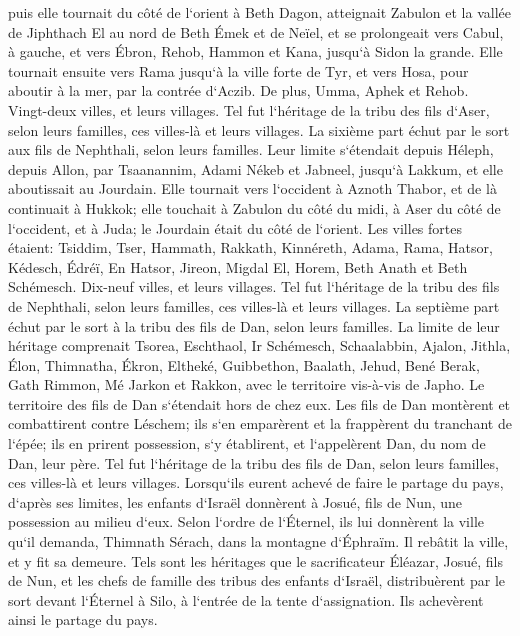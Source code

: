 \verse puis elle tournait du côté de l`orient à Beth Dagon, atteignait Zabulon et la vallée de Jiphthach El au nord de Beth Émek et de Neïel, et se prolongeait vers Cabul, à gauche, 
\verse et vers Ébron, Rehob, Hammon et Kana, jusqu`à Sidon la grande. 
\verse Elle tournait ensuite vers Rama jusqu`à la ville forte de Tyr, et vers Hosa, pour aboutir à la mer, par la contrée d`Aczib. 
\verse De plus, Umma, Aphek et Rehob. Vingt-deux villes, et leurs villages. 
\verse Tel fut l`héritage de la tribu des fils d`Aser, selon leurs familles, ces villes-là et leurs villages. 
\verse La sixième part échut par le sort aux fils de Nephthali, selon leurs familles. 
\verse Leur limite s`étendait depuis Héleph, depuis Allon, par Tsaanannim, Adami Nékeb et Jabneel, jusqu`à Lakkum, et elle aboutissait au Jourdain. 
\verse Elle tournait vers l`occident à Aznoth Thabor, et de là continuait à Hukkok; elle touchait à Zabulon du côté du midi, à Aser du côté de l`occident, et à Juda; le Jourdain était du côté de l`orient. 
\verse Les villes fortes étaient: Tsiddim, Tser, Hammath, Rakkath, Kinnéreth, 
\verse Adama, Rama, Hatsor, 
\verse Kédesch, Édréï, En Hatsor, 
\verse Jireon, Migdal El, Horem, Beth Anath et Beth Schémesch. Dix-neuf villes, et leurs villages. 
\verse Tel fut l`héritage de la tribu des fils de Nephthali, selon leurs familles, ces villes-là et leurs villages. 
\verse La septième part échut par le sort à la tribu des fils de Dan, selon leurs familles. 
\verse La limite de leur héritage comprenait Tsorea, Eschthaol, Ir Schémesch, 
\verse Schaalabbin, Ajalon, Jithla, 
\verse Élon, Thimnatha, Ékron, 
\verse Eltheké, Guibbethon, Baalath, 
\verse Jehud, Bené Berak, Gath Rimmon, 
\verse Mé Jarkon et Rakkon, avec le territoire vis-à-vis de Japho. 
\verse Le territoire des fils de Dan s`étendait hors de chez eux. Les fils de Dan montèrent et combattirent contre Léschem; ils s`en emparèrent et la frappèrent du tranchant de l`épée; ils en prirent possession, s`y établirent, et l`appelèrent Dan, du nom de Dan, leur père. 
\verse Tel fut l`héritage de la tribu des fils de Dan, selon leurs familles, ces villes-là et leurs villages. 
\verse Lorsqu`ils eurent achevé de faire le partage du pays, d`après ses limites, les enfants d`Israël donnèrent à Josué, fils de Nun, une possession au milieu d`eux. 
\verse Selon l`ordre de l`Éternel, ils lui donnèrent la ville qu`il demanda, Thimnath Sérach, dans la montagne d`Éphraïm. Il rebâtit la ville, et y fit sa demeure. 
\verse Tels sont les héritages que le sacrificateur Éléazar, Josué, fils de Nun, et les chefs de famille des tribus des enfants d`Israël, distribuèrent par le sort devant l`Éternel à Silo, à l`entrée de la tente d`assignation. Ils achevèrent ainsi le partage du pays. 

